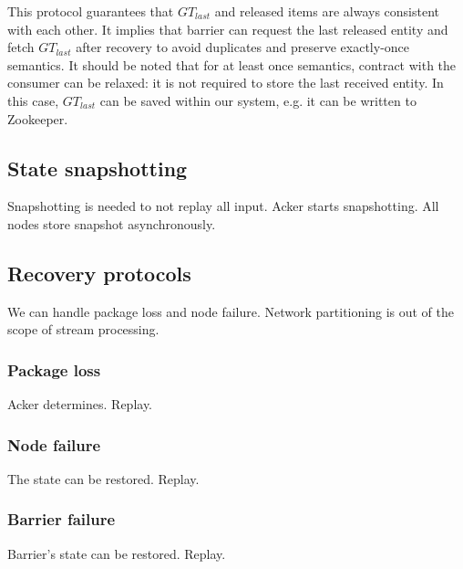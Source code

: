 This protocol guarantees that $GT_{last}$ and released items are always consistent with each other. It implies that barrier can request the last released entity and fetch $GT_{last}$ after recovery to avoid duplicates and preserve exactly-once semantics. It should be noted that for at least once semantics, contract with the consumer can be relaxed: it is not required to store the last received entity. In this case, $GT_{last}$ can be saved within our system, e.g. it can be written to Zookeeper.

\subsection{State snapshotting}
Snapshotting is needed to not replay all input. Acker starts snapshotting. All nodes store snapshot asynchronously.

\subsection{Recovery protocols}
We can handle package loss and node failure. Network partitioning is out of the scope of stream processing.

\subsubsection{Package loss}
Acker determines. Replay.

\subsubsection{Node failure}
The state can be restored. Replay.

\subsubsection{Barrier failure}
Barrier's state can be restored. Replay.